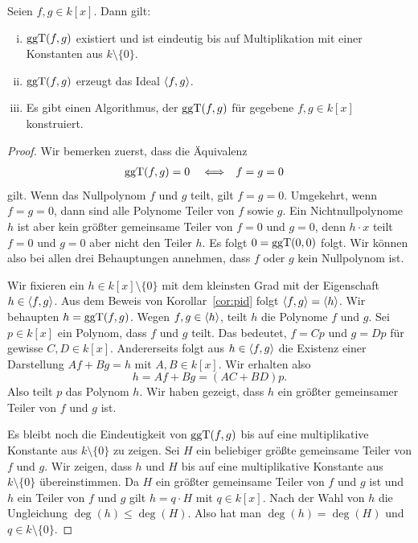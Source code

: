 \documentclass[11pt]{article}
\numberwithin{equation}{section}
\begin{document}
\begin{proposition} \label{prop:ggT:zwei}
	Seien $f, g \in k[x]$. Dann gilt: 
	\begin{enumerate}[(i)]
		\item $\operatorname{ggT}(f,g)$ existiert und ist eindeutig bis auf Multiplikation mit einer Konstanten aus $k \setminus \{0\}$. 
		\item $\operatorname{ggT}(f,g)$ erzeugt das Ideal $\left< f,g \right>$. 
		\item Es gibt einen Algorithmus, der $\operatorname{ggT}(f,g)$ für gegebene $f, g \in k[x]$ konstruiert. 
	\end{enumerate} 
\end{proposition} 
\begin{proof}
	Wir bemerken zuerst, dass die Äquivalenz 
	\begin{align*}
		\operatorname{ggT}(f,g) & = 0 & &\Longleftrightarrow  & f & = g=0  
	\end{align*}
	gilt. Wenn das Nullpolynom $f$ und $g$ teilt, gilt $f=g=0$. Umgekehrt, wenn $f=g=0$, dann sind alle Polynome Teiler von $f$ sowie $g$. Ein Nichtnullpolynome $h$ ist aber kein größter gemeinsame Teiler von $f=0$ und $g=0$, denn $h \cdot x$ teilt $f=0$ und $g=0$ aber nicht den Teiler $h$. 
	Es folgt $0 = \operatorname{ggT}(0,0)$ folgt. Wir können also bei allen drei Behauptungen annehmen, dass $f$ oder $g$ kein Nullpolynom ist. 
	
	Wir fixieren ein  $h \in k[x] \setminus \{0\}$ mit dem kleinsten Grad mit der Eigenschaft $h \in \left< f,g \right>$.
	Aus dem Beweis von Korollar~\ref{cor:pid} folgt $\left< f,g \right> = \left< h \right>$. Wir behaupten $h = \operatorname{ggT}(f,g)$. Wegen $f, g \in \left< h \right>$, teilt $h$ die Polynome $f$ und $g$. Sei $p \in k[x]$ ein Polynom, dass $f$ und $g$ teilt. Das bedeutet, $f = C p$ und $g = D p$ für gewisse $C, D \in k[x]$. Andererseits folgt aus $h \in \left< f,g \right>$ die Existenz einer Darstellung $A f + B g = h$ mit $A, B \in k[x]$. Wir erhalten also 
	\[
		h = A f + B g  = (A C + B D) p.
	\]
	Also teilt $p$ das Polynom $h$. Wir haben gezeigt, dass $h$ ein größter gemeinsamer Teiler von $f$ und $g$ ist. 
	
	Es bleibt noch die Eindeutigkeit von $\operatorname{ggT}(f,g)$ bis auf eine multiplikative Konstante aus $k \setminus \{0\}$ zu zeigen.  Sei $H$ ein beliebiger größte gemeinsame Teiler von $f$ und $g$. Wir zeigen, dass $h$ und $H$ bis auf eine multiplikative Konstante aus $k \setminus \{0\}$ übereinstimmen. Da $H$ ein größter gemeinsame Teiler von $f$ und $g$ ist und $h$ ein Teiler von $f$ und $g$ gilt $h = q \cdot H$ mit $q \in k[x]$. Nach der Wahl von $h$ die Ungleichung $\deg(h) \le \deg(H)$. Also hat man $\deg(h) = \deg(H)$ und $q \in k \setminus \{0\}$. 
	

\end{proof}
\end{document}
